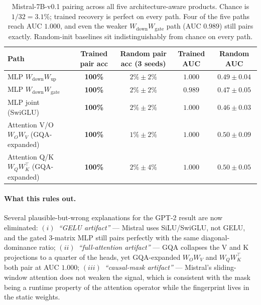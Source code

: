 \documentclass[10pt]{article}
\theoremstyle{remark}
\begin{document}
\begin{table}[H]
\centering
\small
\renewcommand{\arraystretch}{1.15}
\begin{tabular}{lcccc}
\toprule
Path & Trained pair acc & Random pair acc (3 seeds) & Trained AUC & Random AUC \\
\midrule
MLP $W_{\mathrm{down}} W_{\mathrm{up}}$                & \textbf{100\%} & $2\% \pm 2\%$ & $\mathbf{1.000}$ & $0.49 \pm 0.04$ \\
MLP $W_{\mathrm{down}} W_{\mathrm{gate}}$              & \textbf{100\%} & $2\% \pm 2\%$ & $0.989$          & $0.47 \pm 0.05$ \\
MLP joint (SwiGLU)                                     & \textbf{100\%} & $2\% \pm 2\%$ & $\mathbf{1.000}$ & $0.46 \pm 0.03$ \\
Attention V/O $W_O W_V$ (GQA-expanded)                 & \textbf{100\%} & $1\% \pm 2\%$ & $\mathbf{1.000}$ & $0.50 \pm 0.09$ \\
Attention Q/K $W_Q W_K^\top$ (GQA-expanded)            & \textbf{100\%} & $2\% \pm 4\%$ & $\mathbf{1.000}$ & $0.50 \pm 0.05$ \\
\bottomrule
\end{tabular}
\caption{Mistral-7B-v0.1 pairing across all five architecture-aware
products. Chance is $1/32 = 3.1\%$; trained recovery is perfect on
every path. Four of the five paths reach AUC $1.000$, and even the
weaker $W_{\mathrm{down}} W_{\mathrm{gate}}$ path (AUC $0.989$) still
pairs exactly. Random-init baselines sit indistinguishably from chance
on every path.}
\label{tab:mistral}
\end{table}

\paragraph{What this rules out.} Several plausible-but-wrong
explanations for the GPT-2 result are now eliminated:
$(i)$~\emph{``GELU artifact''} --- Mistral uses SiLU/SwiGLU, not GELU,
and the gated 3-matrix MLP still pairs perfectly with the same
diagonal-dominance ratio;
$(ii)$~\emph{``full-attention artifact''} --- GQA collapses the V and K
projections to a quarter of the heads, yet GQA-expanded $W_O W_V$ and
$W_Q W_K^\top$ both pair at AUC $1.000$;
$(iii)$~\emph{``causal-mask artifact''} --- Mistral's sliding-window
attention does not weaken the signal, which is consistent with the
mask being a runtime property of the attention operator while the
fingerprint lives in the static weights.
\end{document}
